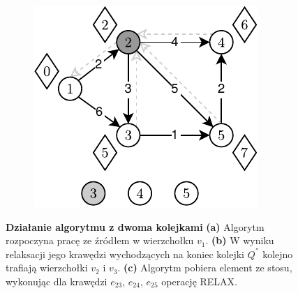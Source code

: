 \begin{figure}[!htbp]
\begin{subfigure}[b]{0.3\textwidth}
		\caption{}
	\end{subfigure}
	\quad
	\begin{subfigure}[b]{0.3\textwidth}
		\includegraphics[width=\textwidth]{Chapter_III/GRAPH-GROWTH-2Q-Example/c.pdf}
		\caption{}
	\end{subfigure}
	\caption{\textbf{Działanie algorytmu z dwoma kolejkami} \textbf{(a)} Algorytm rozpoczyna pracę ze źródłem w wierzchołku $v_{1}$. \textbf{(b)} W wyniku relaksacji jego krawędzi wychodzących na koniec kolejki $Q^{''}$ kolejno trafiają wierzchołki $v_{2}$ i $v_{3}$. \textbf{(c)} Algorytm pobiera element ze stosu, wykonując dla krawędzi $e_{23}$, $e_{24}$, $e_{25}$ operację \textsc{RELAX}. } \label{fig:exampleDQQ1}
\end{figure}

